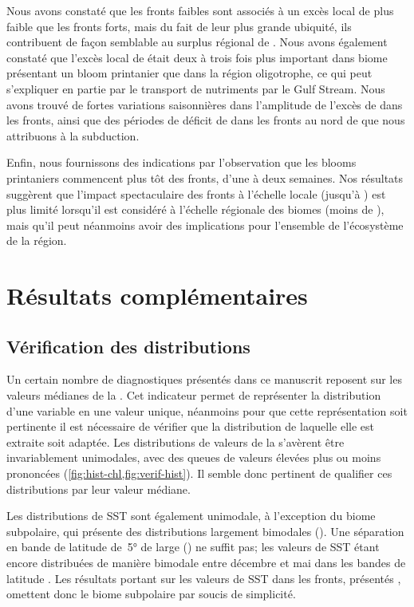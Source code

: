 Nous avons constaté que les fronts faibles sont associés à un excès local de  plus faible que les fronts forts, mais du fait de leur plus grande ubiquité, ils contribuent de façon semblable au surplus régional de .
Nous avons également constaté que l'excès local de  était deux à trois fois plus important dans biome présentant un bloom printanier que dans la région oligotrophe, ce qui peut s'expliquer en partie par le transport de nutriments par le Gulf Stream.
Nous avons trouvé de fortes variations saisonnières dans l'amplitude de l'excès de  dans les fronts, ainsi que des périodes de déficit de  dans les fronts au nord de  que nous attribuons à la subduction.

Enfin, nous fournissons des indications par l'observation que les blooms printaniers commencent plus tôt des fronts, d'une à deux semaines.
Nos résultats suggèrent que l'impact spectaculaire des fronts à l'échelle locale (jusqu'à ) est plus limité lorsqu'il est considéré à l'échelle régionale des biomes (moins de ), mais qu'il peut néanmoins avoir des implications pour l'ensemble de l'écosystème de la région.

\insertArticle{}

\section{Résultats complémentaires}
\label{sec:complements-chl}
\suppressfloats[t]

\subsection{Vérification des distributions}
\label{sec:verif-hist}

Un certain nombre de diagnostiques présentés dans ce manuscrit reposent sur les valeurs médianes de la .
Cet indicateur permet de représenter la distribution d'une variable en une valeur unique, néanmoins pour que cette représentation soit pertinente il est nécessaire de vérifier que la distribution de laquelle elle est extraite soit adaptée.
Les distributions de valeurs de la  s'avèrent être invariablement unimodales, avec des queues de valeurs élevées plus ou moins prononcées (\cref{fig:hist-chl,fig:verif-hist}).
Il semble donc pertinent de qualifier ces distributions par leur valeur médiane.

Les distributions de SST sont également unimodale, à l'exception du biome subpolaire, qui présente des distributions largement bimodales ().
Une séparation en bande de latitude de~\ang{5} de large () ne suffit pas; les valeurs de SST étant encore distribuées de manière bimodale entre décembre et mai dans les bandes de latitude .
Les résultats portant sur les valeurs de SST dans les fronts, présentés , omettent donc le biome subpolaire par soucis de simplicité.

